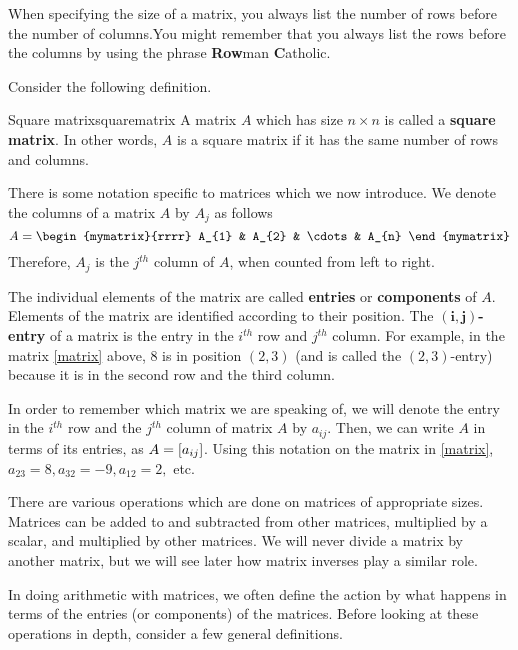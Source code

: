 When specifying the size of a matrix, you always list the number
of rows before the number of columns.You
might remember that you always list the rows before the columns by using the
phrase \textbf{Row}man \textbf{C}atholic. 

Consider the following definition.

\begin{definition}{Square matrix}{squarematrix}
A matrix $A$ which has size $n \times n$ is called a \textbf{square matrix}.
In other words, $A$ is a square matrix if it has the same number of rows
and columns.
\end{definition}

There is some notation specific to matrices which we now introduce. We denote the columns of a matrix $A$ 
by $A_{j}$ as follows
\begin{equation*}
A = 
\begin{mymatrix}{rrrr}
A_{1} & A_{2} & \cdots & A_{n}
\end{mymatrix}
\end{equation*}
Therefore, $A_{j}$ is the $j^{th}$ column of $A$, when counted from left to right. 

The individual elements of the matrix are called \textbf{entries} or \textbf{components} of $A$. Elements of the matrix
are identified according to their position. The $\mathbf{\left( i, j \right)}$\textbf{-entry} of a matrix is the entry 
in the $i^{th}$ row and $j^{th}$ column. For example, in the matrix \ref{matrix} above,  $8$ is in
position $\left(2,3 \right)$ (and is called the $\left(2,3 \right)$-entry) because it is in the second row and the third column. 

In order to remember which matrix we are speaking of, we 
will denote the entry in the $i^{th}$ row  and the $j^{th}$ column of matrix $A$ by $a_{ij}$. Then, we can write $A$ in terms of its entries,
as $A= \left[a_{ij} \right]$. Using this notation on the matrix in \ref{matrix},
$a_{23}=8, a_{32}=-9, a_{12}=2,$ etc.

There are various operations which are done on matrices of appropriate
sizes. Matrices can be added to and subtracted from other matrices,
multiplied by a scalar, and multiplied by other matrices. We will
never divide a matrix by another matrix, but we will see later how matrix inverses play a similar role. 

In doing arithmetic with matrices, we often define the action by what
happens in terms of the entries (or components) of the
matrices. Before looking at these operations in depth, consider a few
general definitions.

